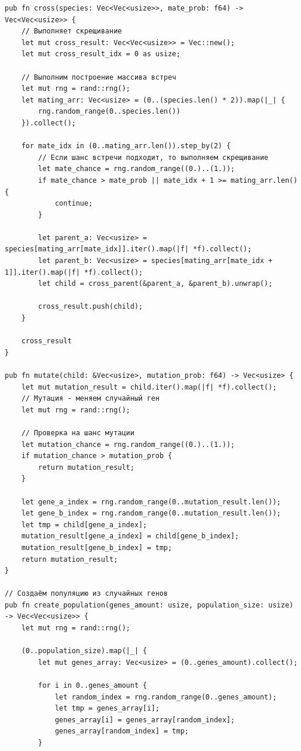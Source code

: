 \documentclass[a4paper,14pt]{extarticle}
\begin{document}
\begin{verbatim}
pub fn cross(species: Vec<Vec<usize>>, mate_prob: f64) -> Vec<Vec<usize>> {
    // Выполняет скрещивание
    let mut cross_result: Vec<Vec<usize>> = Vec::new();
    let mut cross_result_idx = 0 as usize;

    // Выполним построение массива встреч
    let mut rng = rand::rng();
    let mating_arr: Vec<usize> = (0..(species.len() * 2)).map(|_| {
        rng.random_range(0..species.len())
    }).collect();

    for mate_idx in (0..mating_arr.len()).step_by(2) {
        // Если шанс встречи подходит, то выполняем скрещивание
        let mate_chance = rng.random_range((0.)..(1.));
        if mate_chance > mate_prob || mate_idx + 1 >= mating_arr.len() {
            continue;
        }

        let parent_a: Vec<usize> = species[mating_arr[mate_idx]].iter().map(|f| *f).collect();
        let parent_b: Vec<usize> = species[mating_arr[mate_idx + 1]].iter().map(|f| *f).collect();
        let child = cross_parent(&parent_a, &parent_b).unwrap();

        cross_result.push(child);
    }

    cross_result
} 

pub fn mutate(child: &Vec<usize>, mutation_prob: f64) -> Vec<usize> {
    let mut mutation_result = child.iter().map(|f| *f).collect();
    // Мутация - меняем случайный ген
    let mut rng = rand::rng();

    // Проверка на шанс мутации
    let mutation_chance = rng.random_range((0.)..(1.));
    if mutation_chance > mutation_prob {
        return mutation_result;
    }

    let gene_a_index = rng.random_range(0..mutation_result.len());
    let gene_b_index = rng.random_range(0..mutation_result.len());
    let tmp = child[gene_a_index];
    mutation_result[gene_a_index] = child[gene_b_index];
    mutation_result[gene_b_index] = tmp;
    return mutation_result;
}

// Создаём популяцию из случайных генов
pub fn create_population(genes_amount: usize, population_size: usize) -> Vec<Vec<usize>> {
    let mut rng = rand::rng();

    (0..population_size).map(|_| {
        let mut genes_array: Vec<usize> = (0..genes_amount).collect();

        for i in 0..genes_amount {
            let random_index = rng.random_range(0..genes_amount);
            let tmp = genes_array[i];
            genes_array[i] = genes_array[random_index];
            genes_array[random_index] = tmp;
        }


\end{verbatim}
\end{document}

